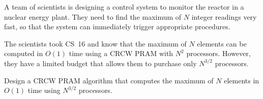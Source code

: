 A team of scientists is designing a control system to monitor the
reactor in a nuclear energy plant.  They need to find the maximum of
$N$ integer readings very fast, so that the system can immediately
trigger appropriate procedures.

The scientists took CS~16 and know that the maximum of $N$ elements
can be computed in $O(1)$ time using a CRCW PRAM with $N^{2}$
processors.  However, they have a limited budget that allows them to
purchase only $N^{3/2}$ processors.

Design a CRCW PRAM algorithm that computes the maximum of $N$ elements
in $O(1)$ time using $N^{3/2}$ processors.
